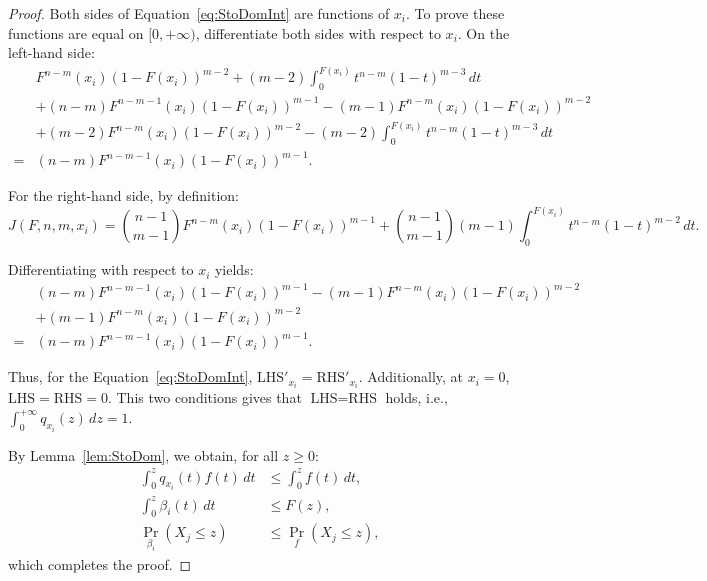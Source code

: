 \begin{proof}
    Both sides of Equation~\eqref{eq:StoDomInt} are functions of \(x_i\). To prove these functions are equal on \([0,+\infty)\), differentiate both sides with respect to \(x_i\). On the left-hand side:
    \[
    \begin{aligned}
        & F^{n-m}(x_i)(1-F(x_i))^{m-2} + (m-2)\int_0^{F(x_i)}t^{n-m}(1-t)^{m-3}\, dt \\
        & + (n-m)F^{n-m-1}(x_i)(1-F(x_i))^{m-1} - (m-1)F^{n-m}(x_i)(1-F(x_i))^{m-2} \\
        & + (m-2)F^{n-m}(x_i)(1-F(x_i))^{m-2} -(m-2)\int_0^{F(x_i)}t^{n-m}(1-t)^{m-3}\, dt \\
        = & (n-m)F^{n-m-1}(x_i)(1-F(x_i))^{m-1}.
    \end{aligned}
    \]

    For the right-hand side, by definition:
    \[
    J(F, n, m, x_i) = \binom{n-1}{m-1}F^{n-m}(x_i)(1-F(x_i))^{m-1} + \binom{n-1}{m-1}(m-1)\int_0^{F(x_i)}t^{n-m}(1-t)^{m-2} \, dt.
    \]

    Differentiating with respect to \(x_i\) yields:
    \[
    \begin{aligned}
        & (n-m)F^{n-m-1}(x_i)(1-F(x_i))^{m-1} - (m-1)F^{n-m}(x_i)(1-F(x_i))^{m-2} \\
        & + (m-1)F^{n-m}(x_i)(1-F(x_i))^{m-2} \\
        = & (n-m)F^{n-m-1}(x_i)(1-F(x_i))^{m-1}.
    \end{aligned}
    \]

    Thus, for the Equation~\eqref{eq:StoDomInt}, \(\text{LHS}'_{x_i} = \text{RHS}'_{x_i}\). Additionally, at \(x_i = 0\), \(\text{LHS} = \text{RHS} = 0\). This two conditions gives that \(\text{LHS} = \text{RHS}\) holds, i.e., \(\int_0^{+\infty}q_{x_i}(z)\, dz = 1\).

    By Lemma~\ref{lem:StoDom}, we obtain, for all \(z \geq 0\):
    \[
    \begin{aligned}
        \int_0^z q_{x_i}(t)f(t) \,dt & \leq \int_0^{z}f(t)\, dt, \\
        \int_0^{z} \beta_i(t)\, dt & \leq F(z), \\
        \Pr_{\beta_i}(X_j \leq z) & \leq \Pr_{f}(X_j \leq z),
    \end{aligned}
    \]which completes the proof.
\end{proof}


